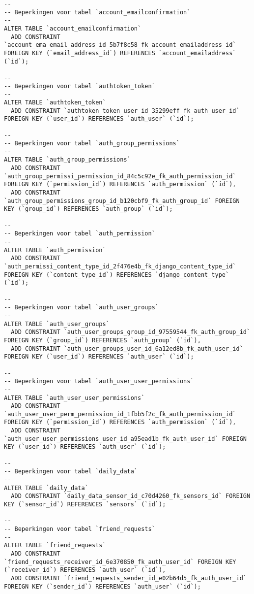\documentclass[11pt]{article}
\begin{document}
\begin{lstlisting}[style=SQL]
--
-- Beperkingen voor tabel `account_emailconfirmation`
--
ALTER TABLE `account_emailconfirmation`
  ADD CONSTRAINT `account_ema_email_address_id_5b7f8c58_fk_account_emailaddress_id` FOREIGN KEY (`email_address_id`) REFERENCES `account_emailaddress` (`id`);

--
-- Beperkingen voor tabel `authtoken_token`
--
ALTER TABLE `authtoken_token`
  ADD CONSTRAINT `authtoken_token_user_id_35299eff_fk_auth_user_id` FOREIGN KEY (`user_id`) REFERENCES `auth_user` (`id`);

--
-- Beperkingen voor tabel `auth_group_permissions`
--
ALTER TABLE `auth_group_permissions`
  ADD CONSTRAINT `auth_group_permissi_permission_id_84c5c92e_fk_auth_permission_id` FOREIGN KEY (`permission_id`) REFERENCES `auth_permission` (`id`),
  ADD CONSTRAINT `auth_group_permissions_group_id_b120cbf9_fk_auth_group_id` FOREIGN KEY (`group_id`) REFERENCES `auth_group` (`id`);

--
-- Beperkingen voor tabel `auth_permission`
--
ALTER TABLE `auth_permission`
  ADD CONSTRAINT `auth_permissi_content_type_id_2f476e4b_fk_django_content_type_id` FOREIGN KEY (`content_type_id`) REFERENCES `django_content_type` (`id`);

--
-- Beperkingen voor tabel `auth_user_groups`
--
ALTER TABLE `auth_user_groups`
  ADD CONSTRAINT `auth_user_groups_group_id_97559544_fk_auth_group_id` FOREIGN KEY (`group_id`) REFERENCES `auth_group` (`id`),
  ADD CONSTRAINT `auth_user_groups_user_id_6a12ed8b_fk_auth_user_id` FOREIGN KEY (`user_id`) REFERENCES `auth_user` (`id`);

--
-- Beperkingen voor tabel `auth_user_user_permissions`
--
ALTER TABLE `auth_user_user_permissions`
  ADD CONSTRAINT `auth_user_user_perm_permission_id_1fbb5f2c_fk_auth_permission_id` FOREIGN KEY (`permission_id`) REFERENCES `auth_permission` (`id`),
  ADD CONSTRAINT `auth_user_user_permissions_user_id_a95ead1b_fk_auth_user_id` FOREIGN KEY (`user_id`) REFERENCES `auth_user` (`id`);

--
-- Beperkingen voor tabel `daily_data`
--
ALTER TABLE `daily_data`
  ADD CONSTRAINT `daily_data_sensor_id_c70d4260_fk_sensors_id` FOREIGN KEY (`sensor_id`) REFERENCES `sensors` (`id`);

--
-- Beperkingen voor tabel `friend_requests`
--
ALTER TABLE `friend_requests`
  ADD CONSTRAINT `friend_requests_receiver_id_6e370850_fk_auth_user_id` FOREIGN KEY (`receiver_id`) REFERENCES `auth_user` (`id`),
  ADD CONSTRAINT `friend_requests_sender_id_e02b64d5_fk_auth_user_id` FOREIGN KEY (`sender_id`) REFERENCES `auth_user` (`id`);


\end{lstlisting}
\end{document}
